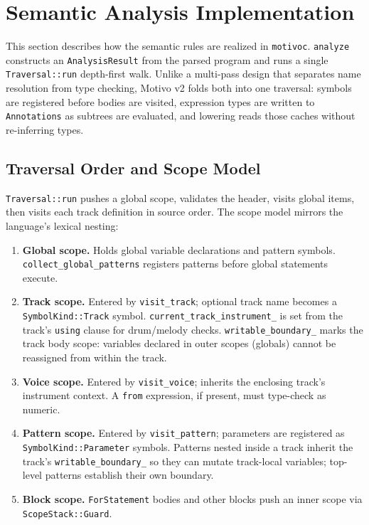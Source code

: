 \section{Semantic Analysis Implementation}\label{sec:semantic-implementation}

This section describes how the semantic rules are realized in \texttt{motivoc}.
\texttt{analyze} constructs an \texttt{AnalysisResult} from the parsed program and runs a single
\texttt{Traversal::run} depth-first walk.
Unlike a multi-pass design that separates name resolution from type checking, Motivo v2 folds both into one traversal:
symbols are registered before bodies are visited, expression types are written to \texttt{Annotations} as subtrees are
evaluated, and lowering reads those caches without re-inferring types.

\subsection{Traversal Order and Scope Model}\label{detail-subsec:semantic-traversal-order}

\texttt{Traversal::run} pushes a global scope, validates the header, visits global items, then visits each track
definition in source order.
The scope model mirrors the language's lexical nesting:

\begin{enumerate}
  \item \textbf{Global scope.} Holds global variable declarations and pattern symbols.
    \texttt{collect\_global\_patterns} registers patterns before global statements execute.
  \item \textbf{Track scope.} Entered by \texttt{visit\_track}; optional track name becomes a \texttt{SymbolKind::Track}
    symbol.
    \texttt{current\_track\_instrument\_} is set from the track's \texttt{using} clause for drum/melody checks.
    \texttt{writable\_boundary\_} marks the track body scope: variables declared in outer scopes (globals) cannot be
    reassigned from within the track.
  \item \textbf{Voice scope.} Entered by \texttt{visit\_voice}; inherits the enclosing track's instrument context.
    A \texttt{from} expression, if present, must type-check as numeric.
  \item \textbf{Pattern scope.} Entered by \texttt{visit\_pattern}; parameters are registered as
    \texttt{SymbolKind::Parameter} symbols.
    Patterns nested inside a track inherit the track's \texttt{writable\_boundary\_} so they can mutate track-local
    variables; top-level patterns establish their own boundary.
  \item \textbf{Block scope.} \texttt{ForStatement} bodies and other blocks push an inner scope via
    \texttt{ScopeStack::Guard}.
\end{enumerate}


